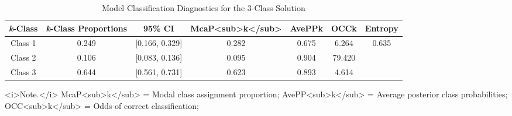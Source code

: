 \documentclass[
]{book}
\begin{document}
\begin{table}[!t]
\caption*{
{\large Model Classification Diagnostics for the 3-Class Solution}
} 
\fontsize{12.0pt}{14.4pt}\selectfont
\begin{tabular*}{\linewidth}{@{\extracolsep{\fill}}ccccccc}
\toprule
\emph{k}-Class & \emph{k}-Class Proportions & 95\% CI & McaP<sub>k</sub> & AvePPk & OCCk & Entropy \\ 
\midrule\addlinespace[2.5pt]
Class 1 & 0.249 & [0.166, 0.329] & 0.282 & 0.675 & 6.264 & 0.635 \\ 
Class 2 & 0.106 & [0.083, 0.136] & 0.095 & 0.904 & 79.420 &  \\ 
Class 3 & 0.644 & [0.561, 0.731] & 0.623 & 0.893 & 4.614 &  \\ 
\bottomrule
\end{tabular*}
\begin{minipage}{\linewidth}
<i>Note.</i> McaP<sub>k</sub> = Modal class assignment proportion; AvePP<sub>k</sub> = Average posterior class probabilities; OCC<sub>k</sub> = Odds of correct classification; \\
\end{minipage}
\end{table}

  
\end{document}
